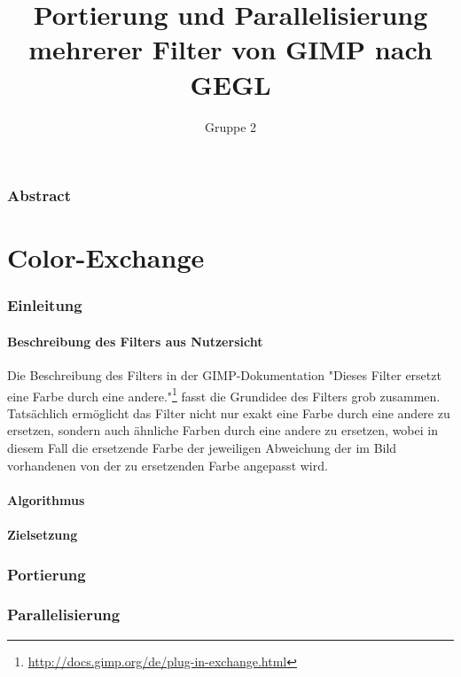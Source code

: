 \documentclass[10pt,a4paper,draft]{article}
\begin{document}
\author{Gruppe 2}
\title{Portierung und Parallelisierung mehrerer Filter von GIMP nach GEGL}
\maketitle

\section*{Abstract}

\part{Color-Exchange}

\section{Einleitung}
 
\subsection{Beschreibung des Filters aus Nutzersicht}
Die Beschreibung des Filters in der GIMP-Dokumentation "Dieses Filter ersetzt eine Farbe durch eine andere."\footnote{\url{http://docs.gimp.org/de/plug-in-exchange.html}} fasst die Grundidee des Filters grob zusammen. Tatsächlich ermöglicht das Filter nicht nur exakt eine Farbe durch eine andere zu ersetzen, sondern auch ähnliche Farben durch eine andere zu ersetzen, wobei in diesem Fall die ersetzende Farbe der jeweiligen Abweichung der im Bild vorhandenen von der zu ersetzenden Farbe angepasst wird.
\subsection{Algorithmus} 

\subsection{Zielsetzung}
\section{Portierung}

\section{Parallelisierung}
\end{document}
